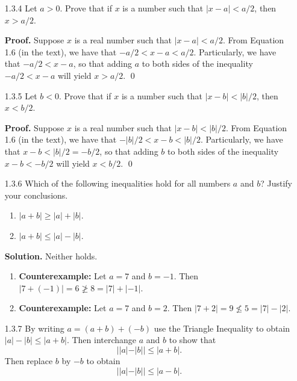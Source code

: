 \begin{enumerate}
      \textbf{Proof.} Let $a$ and $b$ be real numbers. Suppose first that $a$
      and $b$ are positive. By the Positivity Axioms, it follows that $a + b$ 
      must also be positive, so that we have $|a + b| = a + b = |a| + |b|$. Now 
      suppose $a$ and $b$ are both negative. Then it follows that $-a$ and $-b$
      are positive, so that $|a| + |b| = -a + (-b) = -(a + b) = |a + b|$. \qed
   \item[1.3.4]   Let $a > 0$. Prove that if $x$ is a number such that
                  $|x - a| < a/2$, then $x > a/2$. 

      \textbf{Proof.} Suppose $x$ is a real number such that $|x - a| < a/2$.
      From Equation 1.6 (in the text), we have that $-a/2 < x - a < a/2$.
      Particularly, we have that $-a/2 < x - a$, so that adding $a$ to both
      sides of the inequality $-a/2 < x - a$ will yield $x > a/2$. \qed
         
   \item[1.3.5]   Let $b < 0$. Prove that if $x$ is a number such that
                  $|x - b| < |b|/2$, then $x < b/2$.

      \textbf{Proof.} Suppose $x$ is a real number such that $|x - b| < |b|/2$.
      From Equation 1.6 (in the text), we have that $-|b|/2 < x - b < |b|/2$.
      Particularly, we have that $x - b < |b|/2 = -b/2$, so that adding $b$ to 
      both sides of the inequality $x - b < -b/2$ will yield $x < b/2$. \qed 
   \item[1.3.6]   Which of the following inequalities hold for all numbers $a$
                  and $b$? Justify your conclusions.
                  \begin{enumerate}
                     \item $|a + b| \ge |a| + |b|$.
                     \item $|a + b| \le |a| - |b|$.
                  \end{enumerate}

      \textbf{Solution.} Neither holds.
      
      \begin{enumerate}
         \item \textbf{Counterexample:} Let $a = 7$ and $b = -1$. Then
               $|7 + (-1)| = 6 \not\ge 8 = |7| + |-1|$.
         \item \textbf{Counterexample:} Let $a = 7$ and $b = 2$. Then
               $|7 + 2| = 9 \not\le 5 = |7| - |2|$.
      \end{enumerate}
   \item[1.3.7]   By writing $a = (a + b) + (-b)$ use the Triangle Inequality to
                  obtain $|a| - |b| \le |a + b|$. Then interchange $a$ and $b$
                  to show that
                  $$||a| - |b|| \le |a + b|.$$
                  Then replace $b$ by $-b$ to obtain
                  $$||a| - |b|| \le |a - b|.$$


\end{enumerate}
